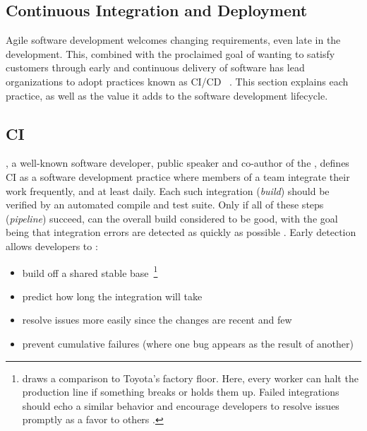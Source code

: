 \begin{appendices}
\section{Continuous Integration and Deployment}
\label{sec:continuous-integration-deployment}

Agile software development welcomes changing requirements, even late in the development. This, combined with the proclaimed goal of wanting to satisfy customers through early and continuous delivery of software has lead organizations to adopt practices known as \ac*{CI/CD}~\cite{beck2001manifesto} \cite[p.~22]{savor2016continuous} \cite[p.~78]{virmani2015understanding}. This section explains each practice, as well as the value it adds to the software development lifecycle.


\subsection{\acl{CI}}
\label{sec:continuous-integration}

\citeauthor{fowler2006continuous}, a well-known software developer, public speaker and co-author of the , defines \ac{CI} as a software development practice where members of a team integrate their work frequently, and at least daily. Each such integration (\textit{build}) should be verified by an automated compile and test suite. Only if all of these steps (\textit{pipeline}) succeed, can the overall build considered to be good, with the goal being that integration errors are detected as quickly as possible \cite[pp.~1,~3]{fowler2006continuous}. Early detection allows developers to \cite[pp.~7,~11--12]{fowler2006continuous}:

\begin{itemize}
  \item build off a shared stable base~\footnote{\citeauthor{meyer2014continuous} draws a comparison to Toyota's factory floor. Here, every worker can halt the production line if something breaks or holds them up. Failed integrations should echo a similar behavior and encourage developers to resolve issues promptly as a favor to others \cite[p.~15]{meyer2014continuous}.}
  \item predict how long the integration will take
  \item resolve issues more easily since the changes are recent and few
  \item prevent cumulative failures (where one bug appears as the result of another)
\end{itemize}


\end{appendices}
